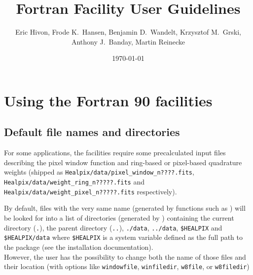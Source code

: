 \documentclass[12pt,twoside]{article}
\begin{document}
\title{\healpix Fortran Facility User Guidelines}
\label{fac:facilities}
\author{Eric Hivon, Frode K.~Hansen, Benjamin D.~Wandelt, Krzysztof M.~G{\oacute}rski,
Anthony J.~Banday, Martin Reinecke}
%
\date{\today}

\frontpage
\tableofcontents
\newpage

\section{Using the \healpix Fortran 90 facilities}
\subsection{Default file names and directories}
\label{fac:subsec:defdir}
For some applications, the \healpix facilities
require some precalculated input files describing the pixel window
function and ring-based or pixel-based quadrature weights (shipped as 
{\tt Healpix/data/pixel\_\-window\_\-n????.fits},
{\tt Healpix/data/weight\_\-ring\_\-n?????.fits} and
{\tt Healpix/data/weight\_\-pixel\_\-n?????.fits} respectively). \label{page:defdir}

By default, files with the very same name (generated by functions such as 
) 
will be looked for into a list of directories (generated by 
) 
containing the current directory (\texttt{.}), the parent directory (\texttt{..}),
\texttt{./data}, \texttt{../data}, \texttt{\$HEALPIX} and \texttt{\$HEALPIX/data} where \texttt{\$HEALPIX} is
a system variable defined as the full path to the \healpix package
(see the installation documentation).\\
However, the user has the possibility to change both the name of those files
and their location (with options like 
\texttt{windowfile},
\texttt{winfiledir},
\texttt{w8file}, or
\texttt{w8filedir})
\end{document}
